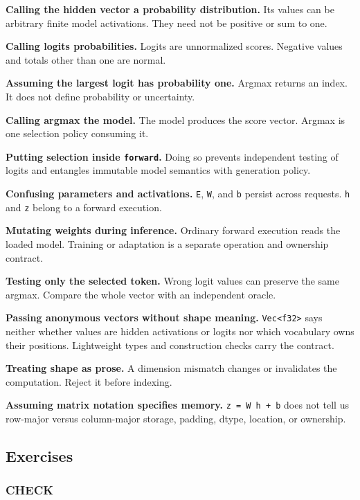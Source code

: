 \documentclass[
  10pt,
]{article}
\begin{document}
\textbf{Calling the hidden vector a probability distribution.} Its
values can be arbitrary finite model activations. They need not be
positive or sum to one.

\textbf{Calling logits probabilities.} Logits are unnormalized scores.
Negative values and totals other than one are normal.

\textbf{Assuming the largest logit has probability one.} Argmax returns
an index. It does not define probability or uncertainty.

\textbf{Calling argmax the model.} The model produces the score vector.
Argmax is one selection policy consuming it.

\textbf{Putting selection inside \texttt{forward}.} Doing so prevents
independent testing of logits and entangles immutable model semantics
with generation policy.

\textbf{Confusing parameters and activations.} \texttt{E}, \texttt{W},
and \texttt{b} persist across requests. \texttt{h} and \texttt{z} belong
to a forward execution.

\textbf{Mutating weights during inference.} Ordinary forward execution
reads the loaded model. Training or adaptation is a separate operation
and ownership contract.

\textbf{Testing only the selected token.} Wrong logit values can
preserve the same argmax. Compare the whole vector with an independent
oracle.

\textbf{Passing anonymous vectors without shape meaning.}
\texttt{Vec\textless{}f32\textgreater{}} says neither whether values are
hidden activations or logits nor which vocabulary owns their positions.
Lightweight types and construction checks carry the contract.

\textbf{Treating shape as prose.} A dimension mismatch changes or
invalidates the computation. Reject it before indexing.

\textbf{Assuming matrix notation specifies memory.}
\texttt{z\ =\ W\ h\ +\ b} does not tell us row-major versus column-major
storage, padding, dtype, location, or ownership.

\subsection{Exercises}\label{exercises-2}

\subsubsection{CHECK}\label{check-2}
\end{document}
